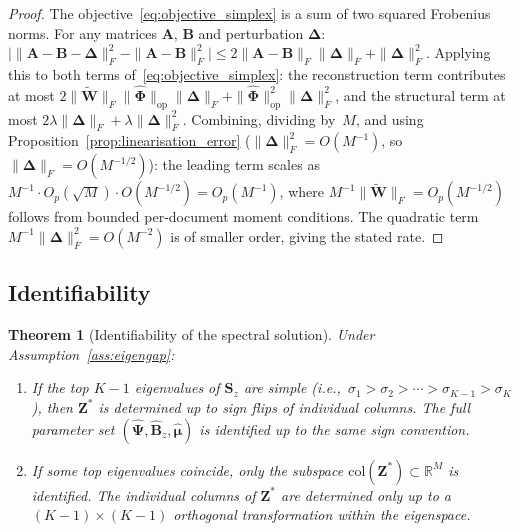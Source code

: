 \documentclass{article}
\newtheorem{theorem}{Theorem}
\begin{document}
\begin{proof}
The objective~\eqref{eq:objective_simplex} is a sum of two squared
Frobenius norms. For any matrices $\mathbf{A}$, $\mathbf{B}$ and
perturbation $\boldsymbol{\Delta}$:
$\bigl|\|\mathbf{A}-\mathbf{B}-\boldsymbol{\Delta}\|_F^2
 - \|\mathbf{A}-\mathbf{B}\|_F^2\bigr|
\leq 2\|\mathbf{A}-\mathbf{B}\|_F\|\boldsymbol{\Delta}\|_F
    + \|\boldsymbol{\Delta}\|_F^2$.
Applying this to both terms of~\eqref{eq:objective_simplex}:
the reconstruction term contributes at most
$2\|\widetilde{\mathbf{W}}\|_F
 \|\hat{\boldsymbol{\Phi}}\|_{\mathrm{op}}
 \|\boldsymbol{\Delta}\|_F
 + \|\hat{\boldsymbol{\Phi}}\|_{\mathrm{op}}^2
   \|\boldsymbol{\Delta}\|_F^2$,
and the structural term at most
$2\lambda\|\boldsymbol{\Delta}\|_F
 + \lambda\|\boldsymbol{\Delta}\|_F^2$.
Combining, dividing by~$M$, and using
Proposition~\ref{prop:linearisation_error}
($\|\boldsymbol{\Delta}\|_F^2 = O(M^{-1})$, so
$\|\boldsymbol{\Delta}\|_F = O(M^{-1/2})$):
the leading term scales as
$M^{-1}\cdot O_p(\sqrt{M})\cdot O(M^{-1/2}) = O_p(M^{-1})$,
where $M^{-1}\|\widetilde{\mathbf{W}}\|_F = O_p(M^{-1/2})$
follows from bounded per-document moment conditions.
The quadratic term $M^{-1}\|\boldsymbol{\Delta}\|_F^2 = O(M^{-2})$
is of smaller order, giving the stated rate.
\end{proof}


\subsection{Identifiability}
\label{subsec:identifiability}

\begin{theorem}[Identifiability of the spectral solution]
\label{thm:identifiability_revised}
Under Assumption~\ref{ass:eigengap}:
\begin{enumerate}
  \item[\emph{(i)}]
    If the top $K{-}1$ eigenvalues of $\mathbf{S}_z$ are \emph{simple}
    (i.e.,\ $\sigma_1>\sigma_2>\cdots>\sigma_{K-1}>\sigma_K$), then
    $\mathbf{Z}^*$ is determined up to sign flips of individual columns.
    The full parameter set
    $(\hat{\boldsymbol{\Psi}},\hat{\mathbf{B}}_z,\hat{\boldsymbol{\mu}})$
    is identified up to the same sign convention.

  \item[\emph{(ii)}]
    If some top eigenvalues coincide, only the subspace
    $\mathrm{col}(\mathbf{Z}^*)\subset\mathbb{R}^M$ is identified.
    The individual columns of $\mathbf{Z}^*$ are determined only up to
    a $(K{-}1)\times(K{-}1)$ orthogonal transformation within the
    eigenspace.
\end{enumerate}
\end{theorem}
\end{document}
